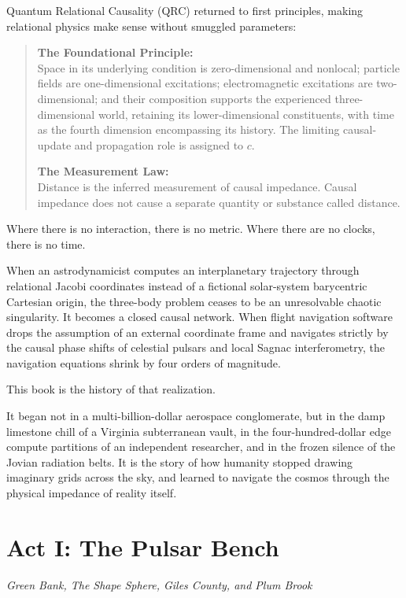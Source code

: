 \documentclass[12pt,twoside,openright]{book}
\newcommand{\dinkus}{%
  \par\vspace{1.2em}%
  {\noindent\centering{\large $\ast\quad\ast\quad\ast$}\par}%
  \vspace{1.2em}%
  \noindent%
}
\begin{document}
Quantum Relational Causality (QRC) returned to first principles, making
relational physics make sense without smuggled parameters:

\begin{quote}
\textbf{The Foundational Principle:}\\
Space in its underlying condition is zero-dimensional and nonlocal;
particle fields are one-dimensional excitations; electromagnetic
excitations are two-dimensional; and their composition supports the
experienced three-dimensional world, retaining its lower-dimensional
constituents, with time as the fourth dimension encompassing its
history. The limiting causal-update and propagation role is assigned to
\(c\).

\textbf{The Measurement Law:}\\
Distance is the inferred measurement of causal impedance. Causal
impedance does not cause a separate quantity or substance called
distance.
\end{quote}

Where there is no interaction, there is no metric. Where there are no
clocks, there is no time.

When an astrodynamicist computes an interplanetary trajectory through
relational Jacobi coordinates instead of a fictional solar-system
barycentric Cartesian origin, the three-body problem ceases to be an
unresolvable chaotic singularity. It becomes a closed causal network.
When flight navigation software drops the assumption of an external
coordinate frame and navigates strictly by the causal phase shifts of
celestial pulsars and local Sagnac interferometry, the navigation
equations shrink by four orders of magnitude.

This book is the history of that realization.

It began not in a multi-billion-dollar aerospace conglomerate, but in
the damp limestone chill of a Virginia subterranean vault, in the
four-hundred-dollar edge compute partitions of an independent
researcher, and in the frozen silence of the Jovian radiation belts. It
is the story of how humanity stopped drawing imaginary grids across the
sky, and learned to navigate the cosmos through the physical impedance
of reality itself.

\dinkus

\mainmatter
\pagestyle{fancy}
\cleardoublepage
\part{Act I: The Pulsar Bench}
\begin{center}\large\itshape Green Bank, The Shape Sphere, Giles County, and Plum Brook\end{center}
\vspace*{30pt}
\end{document}
